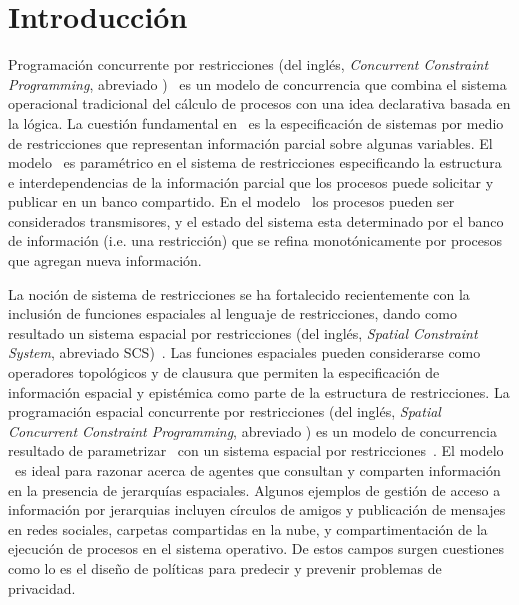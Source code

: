 
\chapter{Introducci\'on}
\label{cha.intro}

Programaci\'on concurrente por restricciones (del ingl\'es, \textit{Concurrent Constraint Programming}, abreviado \CCP)~\cite{DBLP:conf/popl/SaraswatR90,semantic-ccp,cp-book} es un modelo de concurrencia que combina el sistema operacional tradicional del c\'alculo de procesos con una idea declarativa basada en la l\'ogica. La cuesti\'on fundamental en \CCP \ es la especificaci\'on de sistemas por medio de restricciones que representan informaci\'on parcial sobre algunas variables. El modelo \CCP \ es param\'etrico en el sistema de restricciones especificando la estructura e interdependencias de la informaci\'on parcial que los procesos puede solicitar y publicar en un banco compartido. En el modelo  \CCP \ los procesos pueden ser considerados transmisores, y el estado del sistema esta determinado por el banco de informaci\'on (i.e. una restricci\'on) que se refina monot\'onicamente por procesos que agregan nueva informaci\'on.

La noci\'on de sistema de restricciones se ha fortalecido recientemente con la inclusi\'on de funciones espaciales al lenguaje de restricciones, dando como resultado un sistema espacial por restricciones (del ingl\'es, \textit{Spatial Constraint System}, abreviado SCS)~\cite{knight:hal-00761116}. Las funciones espaciales pueden considerarse como operadores topol\'ogicos y de clausura que permiten la especificaci\'on de informaci\'on espacial y epist\'emica como parte de la estructura de restricciones. La programaci\'on espacial concurrente por restricciones (del ingl\'es, \textit{Spatial Concurrent Constraint Programming}, abreviado \SCCP) es un modelo de concurrencia resultado de parametrizar \CCP \ con un sistema espacial por restricciones~\cite{knight:hal-00761116}. El modelo \SCCP \ es ideal para razonar acerca de agentes que consultan y comparten informaci\'on en la presencia de jerarqu\'ias espaciales. Algunos ejemplos de gesti\'on de acceso a informaci\'on por jerarquias incluyen c\'irculos de amigos y publicaci\'on de mensajes en redes sociales, carpetas compartidas en la nube, y compartimentaci\'on de la ejecuci\'on de procesos en el sistema operativo. De estos campos surgen cuestiones como lo es el dise\~no de pol\'iticas para predecir y prevenir problemas de privacidad.


